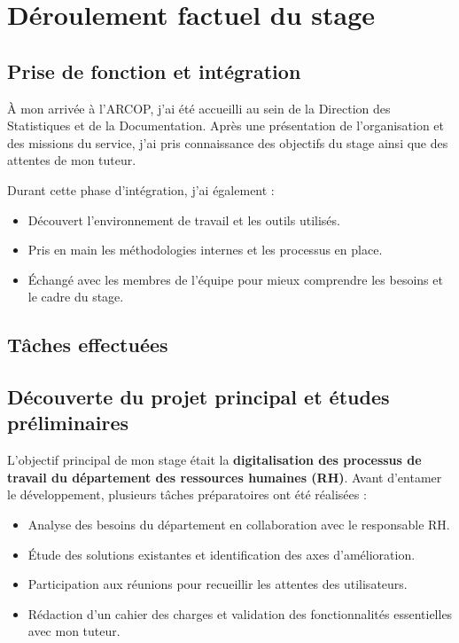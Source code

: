 \chapter{Déroulement factuel du stage}
\clearpage


\section{ Prise de fonction et intégration}
À mon arrivée à l’ARCOP, j’ai été accueilli au sein de la Direction des Statistiques et de la Documentation. Après une présentation de l’organisation et des missions du service, j’ai pris connaissance des objectifs du stage ainsi que des attentes de mon tuteur.

Durant cette phase d’intégration, j’ai également :
\begin{itemize}
    \item Découvert l’environnement de travail et les outils utilisés.
    \item Pris en main les méthodologies internes et les processus en place.
    \item Échangé avec les membres de l’équipe pour mieux comprendre les besoins et le cadre du stage.

\end{itemize}
\section{Tâches effectuées}
\section{Découverte du projet principal et études préliminaires}
L’objectif principal de mon stage était la \textbf{digitalisation des processus de travail du département des ressources humaines (RH)}. Avant d’entamer le développement, plusieurs tâches préparatoires ont été réalisées :




\begin{itemize}
    \item Analyse des besoins du département en collaboration avec le responsable RH.
    \item Étude des solutions existantes et identification des axes d’amélioration.
    \item Participation aux réunions pour recueillir les attentes des utilisateurs.
    \item Rédaction d’un cahier des charges et validation des fonctionnalités essentielles avec mon tuteur.
\end{itemize}

